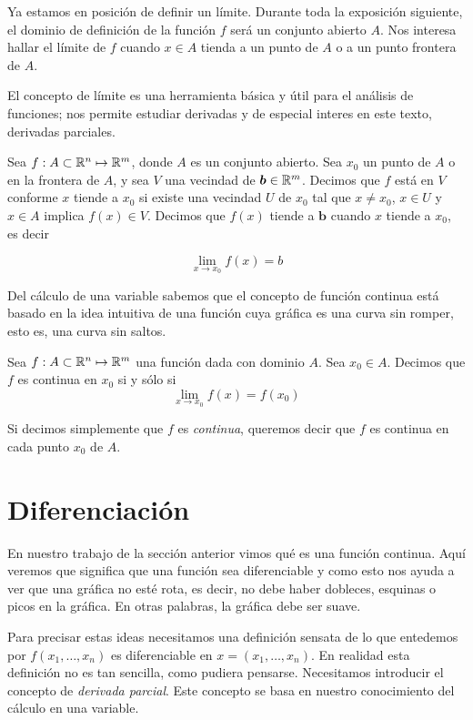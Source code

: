 Ya estamos en posición de definir un límite. Durante toda la exposición siguiente, el dominio de definición de la función $f$ será un conjunto abierto $A$.
Nos interesa hallar el límite de $f$ cuando $x \in A$ tienda a un punto de $A$ o a un punto frontera de $A$.

El concepto de límite es una herramienta básica y útil para el análisis de funciones; nos permite estudiar derivadas y de especial interes en este texto,
derivadas parciales.

\begin{definition}[Límite]
    Sea $f:A \subset \mathbb{R}^{n} \mapsto \mathbb{R}^{m}$, donde $A$ es un conjunto abierto. Sea $x_{0}$ un punto de $A$ o en la frontera de $A$, y sea
    $V$ una vecindad de $\bm{b} \in \mathbb{R}^{m}$. Decimos que $f$ está en $V$ conforme $x$ tiende a $x_{0}$ si existe una vecindad $U$ de 
    $x_{0}$ tal que $x \neq x_{0}$, $x \in U$ y $x \in A$ implica $f(x) \in V$. Decimos que $f(x)$ tiende a $\bm{b}$ cuando
    $x$ tiende a $x_{0}$, es decir

    $$ \lim_{x \rightarrow x_{0}} f(x) = b $$
\end{definition}

Del cálculo de una variable sabemos que el concepto de función continua está basado en la idea intuitiva de una función cuya gráfica es una
curva sin romper, esto es, una curva sin saltos.

\begin{definition}
    Sea $f:A \subset \mathbb{R}^{n} \mapsto \mathbb{R}^{m}$ una función dada con dominio $A$. Sea $x_{0} \in A$. Decimos que $f$ es continua
    en $x_{0}$ si y sólo si
    $$ \lim_{x \rightarrow x_{0}} f(x) = f(x_{0})$$
\end{definition}

Si decimos simplemente que $f$ es \emph{continua}, queremos decir que $f$ es continua
en cada punto $x_{0}$ de $A$.

\section{Diferenciación}

En nuestro trabajo de la sección anterior vimos qué es una función continua. Aquí veremos que significa que una función sea diferenciable y como
esto nos ayuda a ver que una gráfica no esté rota, es decir, no debe haber dobleces, esquinas o picos en la gráfica. En otras palabras, la gráfica 
debe ser suave.

Para precisar estas ideas necesitamos una definición sensata de lo que entedemos por $f(x_{1}, \ldots, x_{n})$ es diferenciable en $x=(x_{1}, \ldots, x_{n})$.
En realidad esta definición no es tan sencilla, como pudiera pensarse. Necesitamos introducir el concepto de \emph{derivada parcial}. Este concepto se
basa en nuestro conocimiento del cálculo en una variable.

